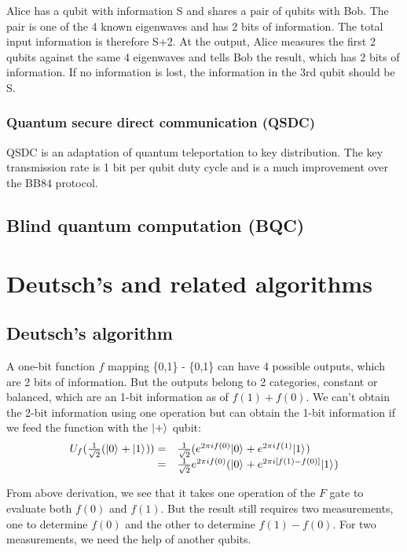 \documentclass[oneside, letter, 12pt]{book}
\begin{document}
Alice has a qubit with information S and shares a pair of qubits with Bob. The pair is one of the 4 known eigenwaves and has 2 bits of information. The total input information is therefore S+2. At the output, Alice measures the first 2 qubits against the same 4 eigenwaves and tells Bob the result, which has 2 bits of information. If no information is lost, the information in the 3rd qubit should be S.

\subsection{Quantum secure direct communication (QSDC)}
QSDC is an adaptation of quantum teleportation to key distribution. The key transmission rate is 1 bit per qubit duty cycle and is a much improvement over the BB84 protocol.

\section{Blind quantum computation (BQC)}

\chapter{Deutsch's and related algorithms}\label{c-Deutsch}

\section{Deutsch's algorithm}
A one-bit function $f$ mapping \{0,1\} -\> \{0,1\} can have 4 possible outputs, which are 2 bits of information. But the outputs belong to 2 categories, constant or balanced, which are an 1-bit information as of $f(1)+f(0)$. We can't obtain the 2-bit information using one operation but can obtain the 1-bit information if we feed the function with the $\vert {+} \rangle_{}$ qubit:
\begin{equation}\label{DeutschF1}
\begin{array}{rl}
    U_f(\frac 1 {\sqrt 2} (\vert {0} \rangle_{}+\vert {1} \rangle_{}) ) = & \frac 1 {\sqrt 2} (e^{2\pi i f(0)} \vert {0} \rangle_{}+ e^{2\pi i f(1)} \vert {1} \rangle_{}) \\
    = & \frac 1 {\sqrt 2} e^{2\pi i f(0)} (\vert {0} \rangle_{}+ e^{2\pi i [f(1)-f(0)]} \vert {1} \rangle_{})
\end{array}
\end{equation}

From above derivation, we see that it takes one operation of the $F$ gate to evaluate both $f(0)$ and $f(1)$. But the result still requires two measurements, one to determine $f(0)$ and the other to determine $f(1)-f(0)$. For two measurements, we need the help of another qubits.
\end{document}

